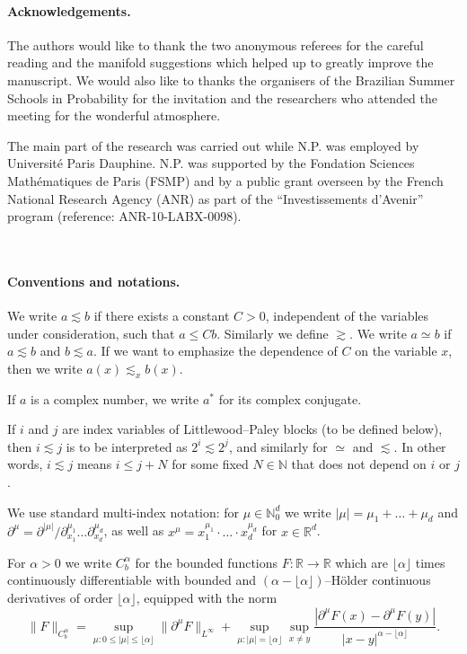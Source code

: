 \documentclass[a4paper,11pt]{article}
\newcommand{\cdummy}{\cdot}
\begin{document}
\paragraph{Acknowledgements.} The authors would like to thank the two anonymous referees for the careful reading and the manifold suggestions which helped up to greatly improve the manuscript. We would also like to thanks the organisers of the Brazilian Summer Schools in Probability for the invitation and the researchers who attended the meeting for the wonderful atmosphere.\


The main part of the research was carried out while N.P. was employed by Universit\'e Paris Dauphine. N.P. was supported by the Fondation Sciences Math\'ematiques de Paris (FSMP) and by a public grant overseen by the French National Research Agency (ANR) as part of the ``Investissements d'Avenir'' program (reference: ANR-10-LABX-0098).

\ \



\paragraph{Conventions and notations.}We write $a \lesssim b$ if there exists
a constant $C > 0$, independent of the variables under consideration, such
that $a \leqslant C b$. Similarly we define $\gtrsim$. We write $a \simeq b$
if $a \lesssim b$ and $b \lesssim a$. If we want to emphasize the dependence
of $C$ on the variable $x$, then we write $a (x) \lesssim_x b (x)$.

If $a$ is a complex number, we write $a^\ast$ for its complex conjugate.

If $i$ and $j$ are index variables of Littlewood--Paley blocks (to be defined
below), then $i \lesssim j$ is to be interpreted as $2^i \lesssim 2^j$, and
similarly for $\simeq$ and $\lesssim$. In other words, $i \lesssim j$ means $i
\leqslant j + N$ for some fixed $N \in \mathbb{N}$ that does not depend on
$i$ or $j$.

We use standard multi-index notation: for ${\mu} \in \mathbb{N}^d_0$ we
write $| {\mu} | ={\mu}_1 + \ldots +{\mu}_d$ and
$\partial^{{\mu}} = \partial^{| {\mu} |} /
\partial^{{\mu}_1}_{x_1} \ldots \partial^{{\mu}_d}_{x_d}$, as well as
$x^{{\mu}} = x^{{\mu}_1}_1 \cdummy \ldots \cdummy x^{{\mu}_d}_d$
for $x \in \mathbb{R}^d$.

For $\alpha > 0$ we write $C^{\alpha}_b$ for the bounded functions $F : \mathbb{R}
\rightarrow \mathbb{R}$ which are $\lfloor \alpha \rfloor$ times continuously
differentiable with bounded and $(\alpha - \lfloor \alpha \rfloor)$--H{\"o}lder continuous
derivatives of order $\lfloor \alpha \rfloor$, equipped with the norm
$$\| F \|_{C^{\alpha}_b} =\sup_{\mu: 0\le |\mu| \le \lfloor \alpha \rfloor}\|\partial^{{\mu}} F\|_{L^\infty} + \sup_{\mu : |\mu| = \lfloor \alpha \rfloor}\sup_{x\neq y} \frac{|\partial^{{\mu}} F(x)-\partial^{{\mu}} F(y)|}{|x-y|^{\alpha - \lfloor \alpha \rfloor}}.$$
\end{document}

